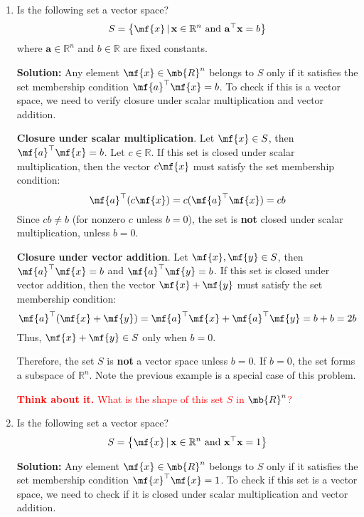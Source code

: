 \begin{enumerate}
    \item Is the following set a vector space?
    $$S = \left\{ \mf{x} \, \vert \, \mathbf{x} \in \mathbb{R}^n \text{ and } \mathbf{a}^\top \mathbf{x} = b \right\} $$
    where $\mathbf{a} \in \mathbb{R}^n$ and $b \in \mathbb{R}$ are fixed constants.

    \begin{boxedstuff}
        \vspace{4mm}
        \textbf{Solution:} Any element $\mf{x} \in \mb{R}^n$ belongs to $S$ only if it satisfies the set membership condition $\mf{a}^\top \mf{x} = b$. To check if this is a vector space, we need to verify closure under scalar multiplication and vector addition.

        \textbf{Closure under scalar multiplication}. Let $\mf{x} \in S$, then $\mf{a}^\top \mf{x} = b$. Let $c \in \mathbb{R}$. If this set is closed under scalar multiplication, then the vector $c\mf{x}$ must satisfy the set membership condition:
        $$\mf{a}^\top (c \mf{x}) = c (\mf{a}^\top \mf{x}) = c b$$
        Since $cb \neq b$ (for nonzero $c$ unless $b = 0$), the set is \textbf{not} closed under scalar multiplication, unless $b = 0$.

        \textbf{Closure under vector addition}. Let $\mf{x}, \mf{y} \in S$, then $\mf{a}^\top \mf{x} = b$ and $\mf{a}^\top \mf{y} = b$. If this set is closed under vector addition, then the vector $\mf{x} + \mf{y}$ must satisfy the set membership condition:
        $$\mf{a}^\top (\mf{x} + \mf{y}) = \mf{a}^\top \mf{x} + \mf{a}^\top \mf{y} = b + b = 2b$$
        Thus, $\mf{x} + \mf{y} \in S$ only when $b = 0$.

        Therefore, the set $S$ is \textbf{not} a vector space unless $b = 0$. If $b = 0$, the set forms a subspace of $\mathbb{R}^n$. Note the previous example is a special case of this problem.

        \textcolor{red}{\textbf{Think about it.} What is the shape of this set $S$ in $\mb{R}^n$?}
    \end{boxedstuff}

    \item Is the following set a vector space?
    $$S = \left\{ \mf{x} \, \vert \, \mathbf{x} \in \mathbb{R}^n \text{ and } \mathbf{x}^\top \mathbf{x} = 1 \right\}$$
    
    \begin{boxedstuff}
        \vspace{4mm}
        \textbf{Solution:} Any element $\mf{x} \in \mb{R}^n$ belongs to $S$ only if it satisfies the set membership condition $\mf{x}^\top \mf{x} = 1$. To check if this set is a vector space, we need to check if it is closed under scalar multiplication and vector addition.


\end{boxedstuff}
\end{enumerate}
